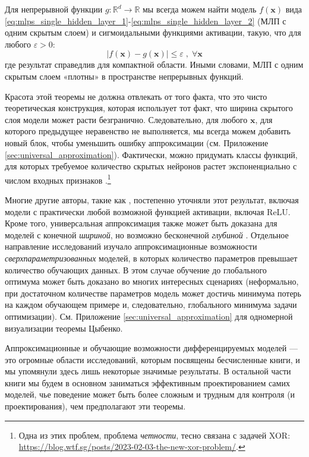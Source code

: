 \begin{theorem}
Для непрерывной функции $g: \mathbb{R}^d \rightarrow \mathbb{R}$ мы всегда можем найти модель $f(\mathbf{x})$ вида \eqref{eq:mlps_single_hidden_layer_1}-\eqref{eq:mlps_single_hidden_layer_2} (МЛП с одним скрытым слоем) и сигмоидальными функциями активации, такую, что для любого $\varepsilon > 0$:
%
$$
\lvert f(\mathbf{x}) - g(\mathbf{x})\rvert\le\varepsilon \;,\;\forall \mathbf{x}
$$
%
где результат справедлив для компактной области. Иными словами, МЛП с одним скрытым слоем «плотны» в пространстве непрерывных функций.
\end{theorem}

Красота этой теоремы не должна отвлекать от того факта, что это чисто теоретическая конструкция, которая использует тот факт, что ширина скрытого слоя модели может расти безгранично. Следовательно, для любого $\mathbf{x}$, для которого предыдущее неравенство не выполняется, мы всегда можем добавить новый блок, чтобы уменьшить ошибку аппроксимации (см. Приложение \ref{sec:universal_approximation}). Фактически, можно придумать классы функций, для которых требуемое количество скрытых нейронов растет экспоненциально с числом входных признаков \cite{bengio2009learning}.\footnote{Одна из этих проблем, проблема \textit{четности}, тесно связана с задачей XOR: \url{https://blog.wtf.sg/posts/2023-02-03-the-new-xor-problem/}.}

Многие другие авторы, такие как \cite{hornik1991approximation}, постепенно уточняли этот результат, включая модели с практически любой возможной функцией активации, включая ReLU. Кроме того, универсальная аппроксимация также может быть доказана для моделей с конечной \textit{шириной}, но возможно бесконечной \textit{глубиной} \cite{lu2017expressive}. Отдельное направление исследований изучало аппроксимационные возможности \textit{сверхпараметризованных} моделей, в которых количество параметров превышает количество обучающих данных. В этом случае обучение до глобального оптимума может быть доказано во многих интересных сценариях \cite{du2018gradient,allen2019learning} (неформально, при достаточном количестве параметров модель может достичь минимума потерь на каждом обучающем примере и, следовательно, глобального минимума задачи оптимизации).  См. Приложение \ref{sec:universal_approximation} для одномерной визуализации теоремы Цыбенко.

Аппроксимационные и обучающие возможности дифференцируемых моделей — это огромные области исследований, которым посвящены бесчисленные книги, и мы упомянули здесь лишь некоторые значимые результаты. В остальной части книги мы будем в основном заниматься эффективным проектированием самих моделей, чье поведение может быть более сложным и трудным для контроля (и проектирования), чем предполагают эти теоремы.

